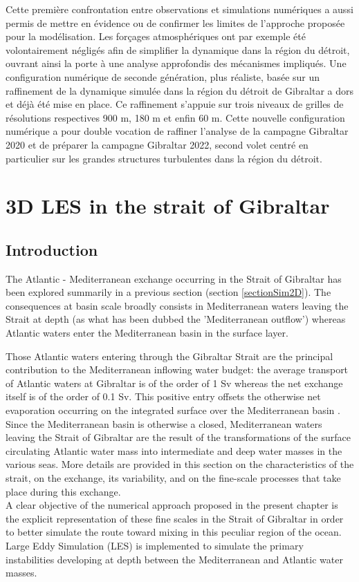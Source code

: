 Cette première confrontation entre observations et simulations numériques a aussi permis de mettre en évidence ou de confirmer les limites de l'approche proposée pour la modélisation. Les forçages atmosphériques ont par exemple été volontairement négligés afin de simplifier la dynamique dans la région du détroit, ouvrant ainsi la porte à une analyse approfondis des mécanismes impliqués. Une configuration numérique de seconde génération, plus réaliste, basée sur un raffinement de la dynamique simulée dans la région du détroit de Gibraltar a dors et déjà été mise en place. Ce raffinement s'appuie sur trois niveaux de grilles de résolutions respectives 900 m, 180 m et enfin 60 m. Cette nouvelle configuration numérique a pour double vocation de raffiner l'analyse de la campagne Gibraltar 2020 et de préparer la campagne Gibraltar 2022, second volet centré en particulier sur les grandes structures turbulentes dans la région du détroit.


\section{3D LES in the strait of Gibraltar}
\label{sectionSim3D}
\subsection{Introduction}

The Atlantic - Mediterranean exchange occurring in the Strait of Gibraltar has been explored summarily in a previous section (section \ref{sectionSim2D}). The consequences at basin scale broadly consists in Mediterranean waters leaving the Strait at depth (as what has been dubbed the 'Mediterranean outflow') whereas Atlantic waters enter the Mediterranean basin in the surface layer.

Those Atlantic waters entering through the Gibraltar Strait are the principal contribution to the Mediterranean inflowing water budget: the average transport of Atlantic waters at Gibraltar is of the order of 1 Sv whereas the net exchange itself is of the order of 0.1 Sv. This positive entry offsets the otherwise net evaporation occurring on the integrated surface over the Mediterranean basin \citep{bryden_1994}.
Since the Mediterranean basin is otherwise a closed, Mediterranean waters leaving the Strait of Gibraltar are the result of the transformations of the surface circulating Atlantic water mass into intermediate and deep water masses in the various seas.
More details are provided in this section on the characteristics of the strait, on the exchange, its variability, and on the fine-scale processes that take place during this exchange.\\
A clear objective of the numerical approach proposed in the present chapter is the explicit representation of these fine scales in the Strait of Gibraltar in order to better simulate the route toward mixing in this peculiar region of the ocean. Large Eddy Simulation (LES) is implemented to simulate the primary instabilities developing at depth between the Mediterranean and Atlantic water masses.

